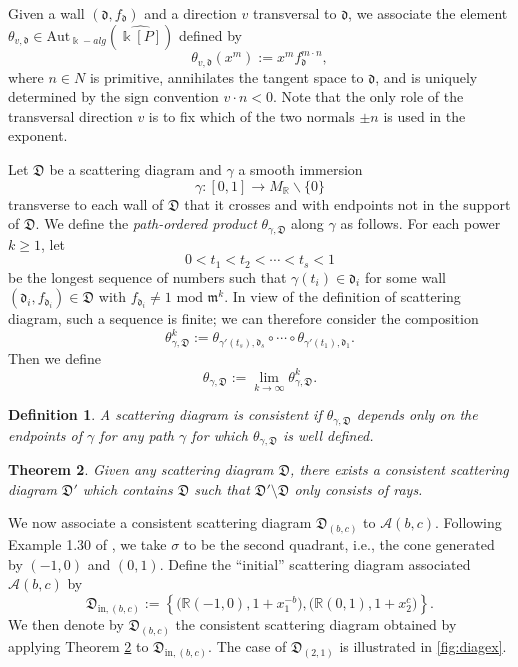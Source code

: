 \documentclass[11pt]{amsart}
\newtheorem{theorem}{Theorem}[section]
\newtheorem{defn}[theorem]{Definition}
\theoremstyle{remark}
\numberwithin{equation}{section}
\newcommand{\RR}{\mathbb{R}}
\newcommand{\cA}{\mathcal{A}}
\newcommand{\fd}{\mathfrak{d}}
\newcommand{\fD}{\mathfrak{D}}
\newcommand{\fm}{\mathfrak{m}}
\begin{document}

Given a wall $(\fd, f_{\fd})$ and a direction $v$ transversal to $\fd$, we associate the element $\theta_{v,\fd}\in
{\mathrm{Aut}}_{\Bbbk-alg}\left(\widehat{\Bbbk[P]}\right)$ defined by
\[
  \theta_{v,\fd} (x^m) := x^m f_{\fd}^{m\cdot n }, 
\]
where $n\in N$ is primitive, annihilates the tangent space to $\fd$, and is
uniquely determined by the sign convention $ v\cdot n <0$.  Note
that the only role of the transversal direction $v$ is to fix which of the two
normals $\pm n$ is used in the exponent. 

Let $\fD$ be a scattering diagram and $\gamma$ a smooth immersion
\[  
  \gamma: [0,1] \rightarrow M_{\mathbb{R}} \smallsetminus  \{0 \}  
\]
transverse to each wall of $\fD$ that it crosses and with endpoints not in the support of $\fD$. We define the \textit{path-ordered product} $\theta_{\gamma, \fD}$ along $\gamma$ as follows. For each power $k \geq 1$, let  
\[
  0< t_1 <  t_2 < \cdots < t_s < 1 
\]
be the longest sequence of numbers such that $\gamma(t_i)\in\fd_i$ for some wall
$(\fd_i,f_{\fd_i}) \in \fD$ with $f_{\fd_i} \neq 1 \text{ mod } \fm^k$.  In view of the definition of scattering diagram, such a sequence is finite; we
can therefore consider the composition 
\[
  \theta^k_{\gamma, \fD} :=
  \theta_{\gamma'(t_s),\fd_s} \circ \cdots \circ \theta_{\gamma'(t_1),\fd_1}.
\]
Then we define
\[
  \theta_{\gamma, \fD} := \lim_{k \rightarrow \infty} \theta ^k_{\gamma, \fD}. 
\]

\begin{defn}
  A scattering diagram is \emph{consistent} if $\theta _{\gamma, \fD}$ depends
  only on the endpoints of $\gamma$ for any path $\gamma$ for which
  $\theta_{\gamma, \fD}$ is well defined.
\end{defn}

\begin{theorem}\cite{KS}
  \label{th:KS}
  Given any scattering diagram $\fD$, there exists a consistent scattering
  diagram $\fD'$ which contains $\fD$ such that $\fD'\setminus\fD$ only consists
  of rays.
\end{theorem}

We now associate a consistent scattering diagram $\fD_{(b,c)}$ to 
$\cA(b,c)$.  Following Example 1.30 of \cite{GHKK}, we take $\sigma$ to be the second quadrant, i.e., the cone generated by $(-1,0)$ and
$(0,1)$. Define the ``initial'' scattering diagram associated $\cA(b,c)$ by
\[
  \fD_{\mathrm{in},(b,c)} := 
  \left\{
    \big( \RR (-1,0), 1+x_1^{-b}\big), 
    \big( \RR (0,1), 1+x_2^c\big) 
  \right\}.
\]
We then denote by $\fD_{(b,c)}$ the consistent scattering diagram obtained by
applying Theorem \ref{th:KS} to $\fD_{\mathrm{in},(b,c)}$.  The case of $\fD_{(2,1)}$ is illustrated in \cref{fig:diagex}.
\end{document}
